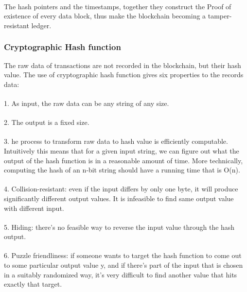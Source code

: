 \documentclass[doublespacing]{bmcart}
\begin{document}
\begin{CJK*}{UTF8}{gbsn}
\paragraph{} 
The hash pointers and the timestamps, together they construct the Proof of existence of every data block, thus make the blockchain becoming a tamper-resistant ledger. 
\subsubsection*{Cryptographic Hash function}
The raw data of transactions are not recorded in the blockchain, but their hash value. The use of cryptographic hash function gives six properties to the records data:
\paragraph{}  1. As input, the raw data can be any string of any size.
\paragraph{}  2. The output is a fixed size.
\paragraph{}  3. he process to transform raw data to hash value is efficiently computable. Intuitively this means that for a given input string, we can figure out what the output of the hash function is in a reasonable amount of time. More technically, computing the hash of an n‐bit string should have a running time that is O(n).
\paragraph{}  4. Collision-resistant: even if the input differs by only one byte, it will produce significantly different output values. It is infeasible to find same output value with different input.
\paragraph{} 5. Hiding: there's no  feasible way to reverse the input value through the hash output.
\paragraph{} 6. Puzzle friendliness: if someone wants to target the hash function to come out to some
particular output value y, and if there’s part of the input that is chosen in a suitably randomized way,
it’s very difficult to find another value that hits exactly that target.

\end{CJK*}
\end{document}
